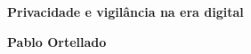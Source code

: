 \textbf{Privacidade e vigilância na era digital} \lipsum[1]

\textbf{Pablo Ortellado} \lipsum[2]







